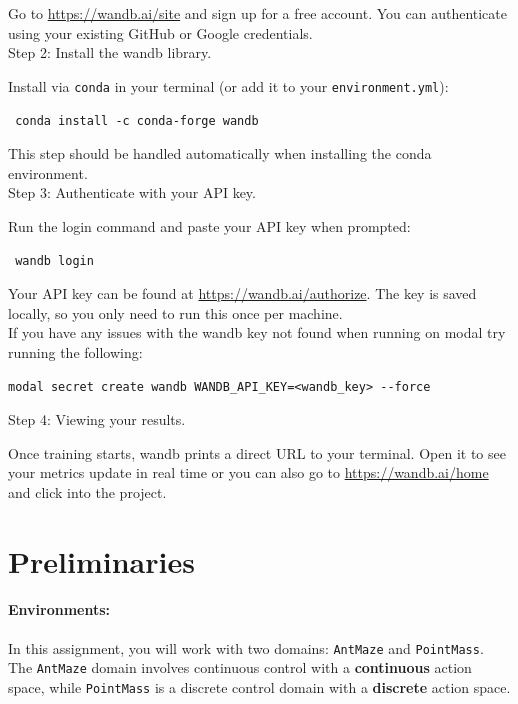 \documentclass[12pt]{article}
\begin{document}
\noindent Go to \url{https://wandb.ai/site} and sign up for a free account. You can authenticate using your existing GitHub or Google credentials. \\

\noindent Step 2: Install the wandb library.
 
\noindent Install via \texttt{conda} in your terminal (or add it to your \texttt{environment.yml}):

\noindent \texttt{
conda install -c conda-forge wandb
}

\noindent This step should be handled automatically when installing the conda environment. \\



\noindent Step 3: Authenticate with your API key.
 
\noindent Run the login command and paste your API key when prompted:
 
\noindent \texttt{
wandb login
}
 
\noindent Your API key can be found at \url{https://wandb.ai/authorize}. The key is saved locally, so you only need to run this once per machine. \\

If you have any issues with the wandb key not found when running on modal try running the following:

\begin{tcolorbox}[width=\linewidth, sharp corners=all, colback=white!95!black]
\begin{verbatim}
modal secret create wandb WANDB_API_KEY=<wandb_key> --force
\end{verbatim}
\end{tcolorbox}


\noindent  Step 4: Viewing your results.
 
\noindent Once training starts, wandb prints a direct URL to your terminal. Open it to see your metrics update in real time or you can also go to \url{https://wandb.ai/home} and click into the project. \\

\newpage
\section*{Preliminaries}

\paragraph{Environments: } In this assignment, you will work with two domains: \texttt{AntMaze} and \texttt{PointMass}. The \texttt{AntMaze} domain involves continuous control with a \textbf{continuous} action space, while \texttt{PointMass} is a discrete control domain with a \textbf{discrete} action space.
\end{document}
